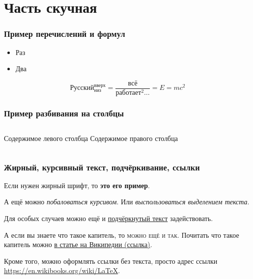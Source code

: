 \documentclass[ignorenonframetext,hyperref={pdftex,unicode}]{beamer}
\begin{document}
\section{Часть скучная}
\begin{frame}\frametitle{Пример перечислений и формул} 
	\begin{itemize}
		\item Раз
		\item Два
	\end{itemize}
	\begin{equation}
    	Русский_{низ}^{вверх} = \frac{всё}{работает^2\dots} = E = m c^2
	\end{equation}
\end{frame}

\begin{frame}\frametitle{Пример разбивания на столбцы}
 	\begin{columns}
 			Содержимое левого столбца
 			Содержимое правого столбца
 	\end{columns}
\end{frame}

\begin{frame}\frametitle{Жирный, курсивный текст, подчёркивание, ссылки}
	Если нужен жирный шрифт, то \textbf{это его пример}.

	А ещё можно \textit{побаловаться курсивом}. Или \emph{выспользоваться выделением текста}.

	Для особых случаев можно ещё и \underline{подчёркнутый текст} задействовать.

	А если вы знаете что такое капитель, то \textsc{можно ещё и так}. Почитать что такое капитель можно \href{https://ru.wikipedia.org/wiki/\%D0\%9A\%D0\%B0\%D0\%BF\%D0\%B8\%D1\%82\%D0\%B5\%D0\%BB\%D1\%8C_\%28\%D1\%88\%D1\%80\%D0\%B8\%D1\%84\%D1\%82\%29}{в статье на Википедии (ссылка)}.

	Кроме того, можно оформлять ссылки без текста, просто адрес ссылки \url{https://en.wikibooks.org/wiki/LaTeX}.
\end{frame}

\end{document}
